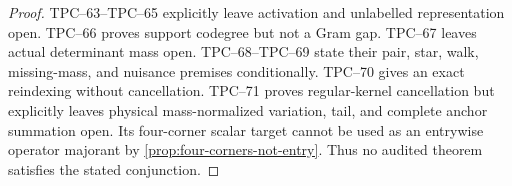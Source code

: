 \begin{proof}
TPC--63--TPC--65 explicitly leave activation and unlabelled representation
open.  TPC--66 proves support codegree but not a Gram gap.  TPC--67 leaves
actual determinant mass open.  TPC--68--TPC--69 state their pair, star,
walk, missing-mass, and nuisance premises conditionally.  TPC--70 gives an
exact reindexing without cancellation.  TPC--71 proves regular-kernel
cancellation but explicitly leaves physical mass-normalized variation,
tail, and complete anchor summation open.  Its four-corner scalar target
cannot be used as an entrywise operator majorant by
\cref{prop:four-corners-not-entry}.  Thus no audited theorem satisfies the
stated conjunction.
\end{proof}

